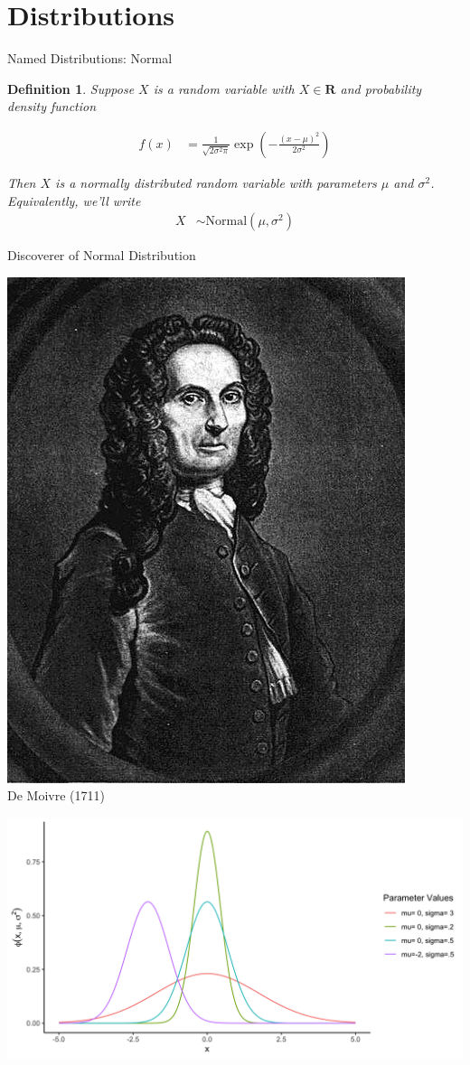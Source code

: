 \documentclass[aspectratio=169, handout]{beamer}
\newtheorem{defn}{Definition}
\numberwithin{equation}{section}
\begin{document}
\section{Distributions}

\begin{frame}{Named Distributions: Normal}

\begin{defn}
Suppose $X$ is a random variable with $X \in \mathbf{R}$ and probability density function

\begin{align*}
f(x) & =  \frac{1}{\sqrt{2\sigma^2\pi}}\exp\left(-\frac{(x - \mu)^2}{2\sigma^2}\right) 
\end{align*}

Then $X$ is a \alert{normally} distributed random variable with parameters $\mu$ and $\sigma^2$.  \\

Equivalently, we'll write 
\begin{align*}
X & \sim  \text{Normal}(\mu, \sigma^2) 
\end{align*}

\end{defn}
\end{frame}




\begin{frame}{Discoverer of Normal Distribution}
\begin{center}
\includegraphics[width=1.8 in]{images/de_moivre.jpeg}\\
De Moivre (1711)
\end{center}
\end{frame}

\begin{frame}
\includegraphics[width=5.8 in]{images/NormalParameters.png}
\end{frame}
\end{document}

